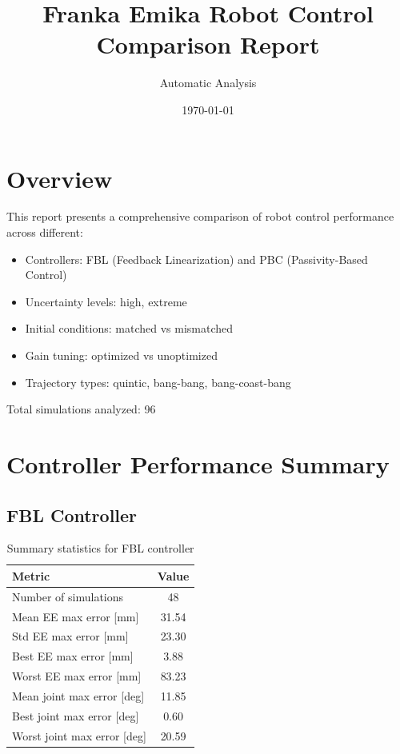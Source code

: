 \documentclass[11pt,a4paper]{article}
\title{Franka Emika Robot Control Comparison Report}
\author{Automatic Analysis}
\date{\today}
\begin{document}
\maketitle
\tableofcontents
\newpage

\section{Overview}

This report presents a comprehensive comparison of robot control performance across different:
\begin{itemize}
  \item Controllers: FBL (Feedback Linearization) and PBC (Passivity-Based Control)
  \item Uncertainty levels: high, extreme
  \item Initial conditions: matched vs mismatched
  \item Gain tuning: optimized vs unoptimized
  \item Trajectory types: quintic, bang-bang, bang-coast-bang
\end{itemize}

Total simulations analyzed: 96

\section{Controller Performance Summary}

\subsection{FBL Controller}

\begin{table}[H]
\centering
\begin{tabular}{lc}
\toprule
Metric & Value \\
\midrule
Number of simulations & 48 \\
Mean EE max error [mm] & 31.54 \\
Std EE max error [mm] & 23.30 \\
Best EE max error [mm] & 3.88 \\
Worst EE max error [mm] & 83.23 \\
\midrule
Mean joint max error [deg] & 11.85 \\
Best joint max error [deg] & 0.60 \\
Worst joint max error [deg] & 20.59 \\
\bottomrule
\end{tabular}
\caption{Summary statistics for FBL controller}
\end{table}
\end{document}
